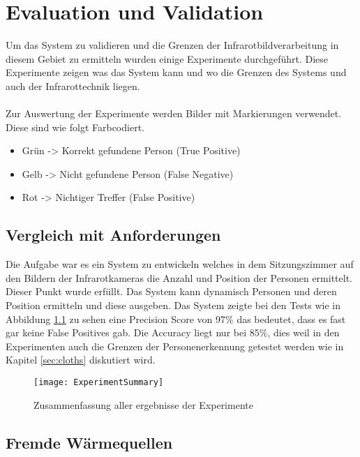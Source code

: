 \chapter{Evaluation und Validation}
\label{ch:Eval}

Um das System zu validieren und die Grenzen der Infrarotbildverarbeitung in diesem Gebiet zu ermitteln wurden einige Experimente durchgeführt. Diese Experimente zeigen was das System kann und wo die Grenzen des Systems und auch der Infrarottechnik liegen.\\
\\
Zur Auswertung der Experimente werden Bilder mit Markierungen verwendet. Diese sind wie folgt Farbcodiert.
\begin{itemize}
	\item Grün -> Korrekt gefundene Person (True Positive)
	\item Gelb -> Nicht gefundene Person (False Negative)
	\item Rot -> Nichtiger Treffer (False Positive)
\end{itemize}

\section{Vergleich mit Anforderungen}
\label{sec:VergleichAnforderungen}

Die Aufgabe war es ein System zu entwickeln welches in dem Sitzungszimmer auf den Bildern der Infrarotkameras die Anzahl und Position der Personen ermittelt. Dieser Punkt wurde erfüllt. Das System kann dynamisch Personen und deren Position ermitteln und diese ausgeben. Das System zeigte bei den Tests wie in Abbildung \ref{fig:ExperimentSummary} zu sehen eine Precision Score von 97\% das bedeutet, dass es fast gar keine False Positives gab. Die Accuracy liegt nur bei 85\%, dies weil in den Experimenten auch die Grenzen der Personenerkennung getestet werden wie in Kapitel \ref{sec:cloths} diskutiert wird.

\begin{figure}[H]
	\centering
	\texttt{[image: ExperimentSummary]}
	\caption{Zusammenfassung aller ergebnisse der Experimente}
	\label{fig:ExperimentSummary}
\end{figure}



\section{Fremde Wärmequellen}
\label{sec:FremdeWärmequellen}

